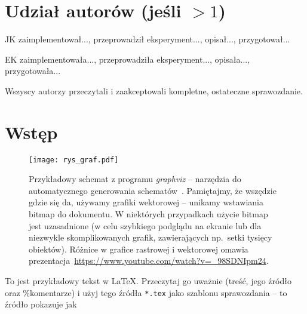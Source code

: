 \documentclass{article}
\begin{document}


\section*{Udział autorów (jeśli $>1$)}
\begin{tightlist}
\item JK zaimplementował..., przeprowadził eksperyment..., opisał..., przygotował...
\item EK zaimplementowała..., przeprowadziła eksperyment..., opisała..., przygotowała...
\item Wszyscy autorzy przeczytali i zaakceptowali kompletne, ostateczne sprawozdanie.
\end{tightlist}




\section{Wstęp}

\begin{figure} %
\begin{center}
\texttt{[image: rys\_graf.pdf]}
\end{center}
\caption{Przykładowy schemat z programu \emph{graphviz} -- narzędzia do automatycznego generowania schematów~\cite{graphviz}. Pamiętajmy, że wszędzie gdzie się da, używamy grafiki wektorowej -- unikamy wstawiania bitmap do dokumentu. W niektórych przypadkach użycie bitmap jest uzasadnione (w celu szybkiego podglądu na ekranie lub dla niezwykle skomplikowanych grafik, zawierających np.~setki tysięcy obiektów). Różnice w grafice rastrowej i wektorowej omawia prezentacja~\url{https://www.youtube.com/watch?v=_98SDNIpm24}.}
\label{fig:schemat}
\end{figure}


To jest przykładowy tekst w LaTeX. Przeczytaj go uważnie (treść, jego źródło oraz \%komentarze) i użyj tego źródła \texttt{*.tex} jako szablonu sprawozdania -- to źródło pokazuje jak
\end{document}
